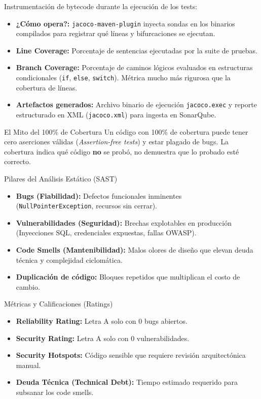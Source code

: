 \documentclass[aspectratio=169]{beamer}
\begin{document}

  {
    {\small
    Instrumentación de bytecode durante la ejecución de los tests:
    \begin{itemize}
      \item \textbf{¿Cómo opera?:} \texttt{jacoco-maven-plugin} inyecta sondas en los binarios compilados para registrar qué líneas y bifurcaciones se ejecutan.
      \item \textbf{Line Coverage:} Porcentaje de sentencias ejecutadas por la suite de pruebas.
      \item \textbf{Branch Coverage:} Porcentaje de caminos lógicos evaluados en estructuras condicionales (\texttt{if}, \texttt{else}, \texttt{switch}). Métrica mucho más rigurosa que la cobertura de líneas.
      \item \textbf{Artefactos generados:} Archivo binario de ejecución \texttt{jacoco.exec} y reporte estructurado en XML (\texttt{jacoco.xml}) para ingesta en SonarQube.
    \end{itemize}
    }
  }
  {El Mito del 100\% de Cobertura}
  {
    Un código con 100\% de cobertura puede tener cero aserciones válidas (\textit{Assertion-free tests}) y estar plagado de bugs. La cobertura indica qué código \textbf{no} se probó, no demuestra que lo probado esté correcto.
  }

  {Pilares del Análisis Estático (SAST)}
  {
    {\footnotesize
    \begin{itemize}
      \setlength{\itemsep}{1.5pt}
      \item \textbf{Bugs (Fiabilidad):} Defectos funcionales inminentes (\texttt{NullPointerException}, recursos sin cerrar).
      \item \textbf{Vulnerabilidades (Seguridad):} Brechas explotables en producción (Inyecciones SQL, credenciales expuestas, fallas OWASP).
      \item \textbf{Code Smells (Mantenibilidad):} Malos olores de diseño que elevan deuda técnica y complejidad ciclomática.
      \item \textbf{Duplicación de código:} Bloques repetidos que multiplican el costo de cambio.
    \end{itemize}
    }
  }
  {Métricas y Calificaciones (Ratings)}
  {
    {\footnotesize
    \begin{itemize}
      \setlength{\itemsep}{1.5pt}
      \item \textbf{Reliability Rating:} Letra A solo con 0 bugs abiertos.
      \item \textbf{Security Rating:} Letra A solo con 0 vulnerabilidades.
      \item \textbf{Security Hotspots:} Código sensible que requiere revisión arquitectónica manual.
      \item \textbf{Deuda Técnica (Technical Debt):} Tiempo estimado requerido para subsanar los code smells.
    \end{itemize}
    }
  }
\end{document}
